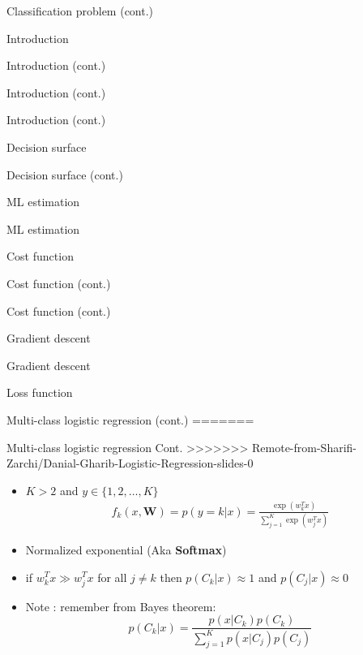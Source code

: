 \documentclass[serif, aspectratio=169]{beamer}
\begin{document}
\begin{frame}{Classification problem (cont.)}
\begin{itemize}
\begin{frame}{Introduction}
\begin{itemize}
\begin{frame}{Introduction (cont.)}
\begin{frame}{Introduction (cont.)}
\begin{frame}{Introduction (cont.)}
\begin{frame}{Decision surface}
\begin{itemize}
\begin{frame}{Decision surface (cont.)}
\begin{frame}{ML estimation}
\begin{frame}{ML estimation}
\begin{itemize}
\begin{frame}{Cost function}
\begin{frame}{Cost function (cont.)}
\begin{itemize}
\begin{itemize}
\begin{frame}{Cost function (cont.)}
\begin{frame}{Gradient descent}
\begin{frame}{Gradient descent}
\begin{frame}{Loss function}
\begin{frame}{Multi-class logistic regression (cont.)}
=======
\begin{frame}{Multi-class logistic regression Cont.}
>>>>>>> Remote-from-Sharifi-Zarchi/Danial-Gharib-Logistic-Regression-slides-0
    \begin{itemize}
        \item $K > 2$ and $y \in \{1,2,\dots,K\}$
        \begin{align*}
            f_k(x, \mathbf{W}) = p(y=k|x) = \frac{\exp{(w^T_kx)}}{\sum_{j=1}^{K}\exp{(w_j^Tx)}}
        \end{align*}
        \item Normalized exponential (Aka \textbf{Softmax})
          
            \item if $w_k^Tx \gg w_j^Tx$ for all $j \neq k$ then $p(C_k|x) \approx 1$ and $p(C_j|x) \approx 0$
            \item Note : remember from Bayes theorem:
                \[
                p(C_k|x) = \frac{p(x|C_k)p(C_k)}
            {\sum_{j=1}^{K}p(x|C_j)p(C_j)}
                \]
          

\end{itemize}
\end{frame}
\end{frame}
\end{frame}
\end{frame}
\end{frame}
\end{frame}
\end{itemize}
\end{itemize}
\end{frame}
\end{frame}
\end{itemize}
\end{frame}
\end{frame}
\end{frame}
\end{itemize}
\end{frame}
\end{frame}
\end{frame}
\end{frame}
\end{itemize}
\end{frame}
\end{itemize}
\end{frame}
\end{document}
